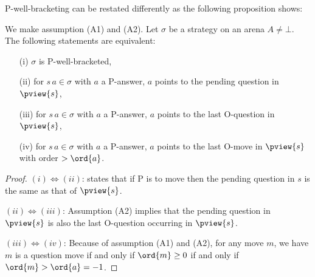 P-well-bracketing can be restated differently as the following proposition shows:
\begin{proposition}
\label{prop:char_wellbrack}
\rm We make assumption (A1) and (A2).
Let $\sigma$ be a strategy on an arena $A\neq \bot$.
The following statements are equivalent:
\begin{enumerate}
\item[(i)] $\sigma$ is P-well-bracketed,
\item[(ii)] for $s \, a \in \sigma$ with $a$ a P-answer, $a$ points to the pending question in $\pview{s}$,
\item[(iii)] for $s \, a \in \sigma$ with $a$ a P-answer, $a$ points to the last O-question in $\pview{s}$,
\item[(iv)] for $s \, a \in \sigma$ with $a$ a P-answer, $a$ points to the last O-move in $\pview{s}$ with order $>\ord{a}$.
\end{enumerate}
\end{proposition}
\begin{proof}
$(i)\iff(ii)$: \cite[Lemma 2.1]{McC96b} states that if P is to move then the pending question in $s$ is the same as that of $\pview{s}$.

$(ii)\iff(iii)$: Assumption (A2) implies that the pending question in $\pview{s}$ is also the last O-question occurring in $\pview{s}$.

$(iii)\iff(iv)$: Because of assumption (A1) and (A2),
for any move $m$, we have $m$ is a question move
if and only if $\ord{m} \geq 0$ if and only if $\ord{m} > \ord{a} = -1$.
\end{proof}




